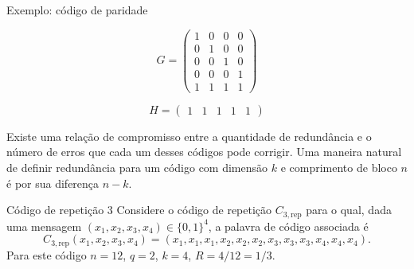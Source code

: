 \begin{frame}[allowframebreaks]
\begin{block}{Exemplo: código de paridade}
    \noindent\begin{minipage}{.5\linewidth}
      \begin{equation}
        G =
        \begin{pmatrix}
          1 & 0 & 0 & 0 \\
          0 & 1 & 0 & 0 \\
          0 & 0 & 1 & 0 \\
          0 & 0 & 0 & 1 \\
          1 & 1 & 1 & 1 
        \end{pmatrix}
      \end{equation}
    \end{minipage}%
    \begin{minipage}{.5\linewidth}
      \begin{equation}
        H =
        \begin{pmatrix}
          1 & 1 & 1 & 1 & 1
        \end{pmatrix}
      \end{equation}
    \end{minipage}
  \end{block}
  Existe uma relação de compromisso entre a quantidade de redundância e o número de
  erros que cada um desses códigos pode corrigir.
  Uma maneira natural de definir redundância para um código com dimensão $k$ e comprimento de bloco $n$ 
  é por sua diferença $n-k$.

  \framebreak
  \begin{block}{Código de repetição 3}
    Considere o código de repetição $C_{3,\text{rep}}$ para o qual, dada uma mensagem $(x_1,x_2,x_3,x_4) \in \{0,1\}^4$,
    a palavra de código associada é
    \begin{equation}
      C_{3,\text{rep}}(x_1,x_2,x_3,x_4) = (x_1,x_1,x_1,x_2,x_2,x_2,x_3,x_3,x_3,x_4,x_4,x_4).
    \end{equation}
    Para este código $n=12$, $q=2$, $k=4$, $R=4/12=1/3$.


\end{block}
\end{frame}
